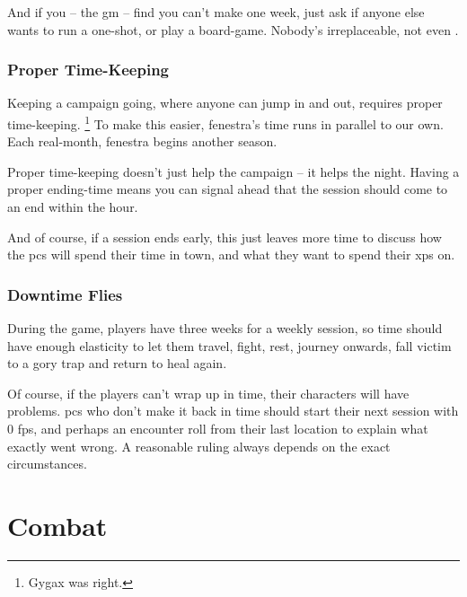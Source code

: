 \begin{multicols}{2}
And if you -- the \gls{gm} -- find you can't make one week, just ask if anyone else wants to run a one-shot, or play a board-game.
Nobody's irreplaceable, not even .

\subsubsection{Proper Time-Keeping}

Keeping a campaign going, where anyone can jump in and out, requires proper time-keeping.%
\footnote{Gygax was right.}
To make this easier, \gls{fenestra}'s time runs in parallel to our own.
Each real-month, \gls{fenestra} begins another season.

Proper time-keeping doesn't just help the campaign -- it helps the night.
Having a proper ending-time means you can signal ahead that the session should come to an end within the hour.

And of course, if a session ends early, this just leaves more time to discuss how the \glspl{pc} will spend their time in town, and what they want to spend their \glspl{xp} on.

\subsubsection{Downtime Flies}

During the game, players have three weeks for a weekly session, so time should have enough elasticity to let them travel, fight, rest, journey onwards, fall victim to a gory trap and return to heal again.

Of course, if the players can't wrap up in time, their characters will have problems.
\Glspl{pc} who don't make it back in time should start their next session with 0 \glspl{fp}, and perhaps an encounter roll from their last location to explain what exactly went wrong.
A reasonable ruling always depends on the exact circumstances.

\end{multicols}

\section{Combat}

